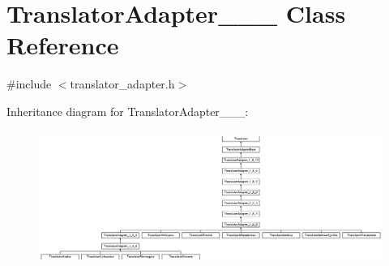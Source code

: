 \hypertarget{class_translator_adapter__1__6__0}{}\section{Translator\+Adapter\+\_\+\_\+\_ Class Reference}
\label{class_translator_adapter__1__6__0}


{\ttfamily \#include $<$translator\+\_\+adapter.\+h$>$}

Inheritance diagram for Translator\+Adapter\+\_\+\_\+\_\+:\begin{figure}[H]
\begin{center}
\leavevmode
\includegraphics[height=4.366472cm]{class_translator_adapter__1__6__0}
\end{center}
\end{figure}
